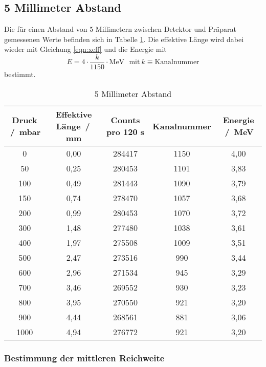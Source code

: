 \subsection{5 Millimeter Abstand}
Die für einen Abstand von 5 Millimetern zwischen Detektor und Präparat gemessenen Werte befinden sich in Tabelle \ref{tab:5mm}.
Die effektive Länge wird dabei wieder mit Gleichung \ref{eqn:xeff} und die Energie mit
\begin{equation*}
  E = 4 \cdot \frac{k}{1150} \cdot \si{\mega\electronvolt} \: \: \: \text{mit} \: k \equiv \text{Kanalnummer}
\end{equation*}
bestimmt.
\begin{table}
  \centering
  \caption{5 Millimeter Abstand}
  \label{tab:5mm}
  \begin{tabular}{c c c c c}
    \toprule
     Druck \,/\, \si{\milli\bar} & Effektive Länge \,/\, \si{\milli\metre} & Counts pro 120 \si{\second} & Kanalnummer & Energie \,/\, \si{\mega\electronvolt}\\
    \midrule
    0   & 0,00 & 284417 & 1150 & 4,00 \\
    50  & 0,25 & 280453 & 1101 & 3,83 \\
    100 & 0,49 & 281443 & 1090 & 3,79 \\
    150 & 0,74 & 278470 & 1057 & 3,68 \\
    200 & 0,99 & 280453 & 1070 & 3,72 \\
    300 & 1,48 & 277480 & 1038 & 3,61 \\
    400 & 1,97 & 275508 & 1009 & 3,51 \\
    500 & 2,47 & 273516 &  990 & 3,44 \\
    600 & 2,96 & 271534 &  945 & 3,29 \\
    700 & 3,46 & 269552 &  930 & 3,23 \\
    800 & 3,95 & 270550 &  921 & 3,20 \\
    900 & 4,44 & 268561 &  881 & 3,06 \\
    1000& 4,94 & 276772 &  921 & 3,20 \\
    \bottomrule
  \end{tabular}
\end{table}
\subsubsection{Bestimmung der mittleren Reichweite}
